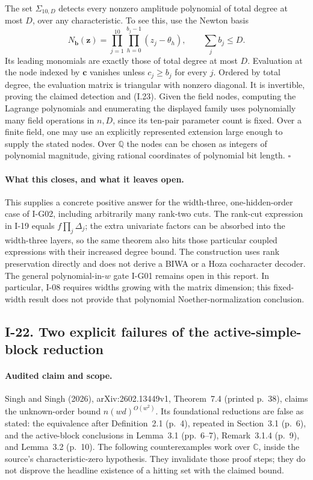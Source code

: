The set $\Sigma_{10,D}$ detects every nonzero amplitude polynomial
of total degree at most $D$, over any characteristic.  To see this,
use the Newton basis
\[
 N_{\mathbf b}(\mathbf z)
  =\prod_{j=1}^{10}\prod_{h=0}^{b_j-1}(z_j-\theta_h),
 \qquad \sum_jb_j\le D.
\]
Its leading monomials are exactly those of total degree at most
$D$.  Evaluation at the node indexed by $\mathbf c$ vanishes
unless $c_j\ge b_j$ for every $j$.  Ordered by total degree,
the evaluation matrix is triangular with nonzero diagonal.
It is invertible, proving the claimed detection and (I.23).
Given the field nodes, computing the Lagrange polynomials and
enumerating the displayed family uses polynomially many field
operations in $n,D$, since its ten-pair parameter count is fixed.
Over a finite field, one may use an explicitly represented
extension large enough to supply the stated nodes.  Over
$\mathbb Q$ the nodes can be chosen as integers of polynomial
magnitude, giving rational coordinates of polynomial bit length.
\hfill$\square$

\paragraph{What this closes, and what it leaves open.}
This supplies a concrete positive answer for the width-three,
one-hidden-order case of I-G02, including arbitrarily many
rank-two cuts.  The rank-cut expression in I-19 equals
$f\prod_j\Delta_j$; the extra univariate factors can be absorbed
into the width-three layers, so the same theorem also hits those
particular coupled expressions with their increased degree bound.
The construction uses rank preservation directly and does not
derive a BIWA or a Hoza cocharacter decoder.
The general polynomial-in-$w$ gate I-G01 remains open in this
report.  In particular, I-08 requires widths growing with the
matrix dimension; this fixed-width result does not provide that
polynomial Noether-normalization conclusion.


\subsection{I-22. Two explicit failures of the active-simple-block reduction}
\label{I-22}

\paragraph{Audited claim and scope.}
Singh and Singh (2026), arXiv:2602.13449v1, Theorem~7.4
(printed p.~38), claims the unknown-order bound
$n(wd)^{O(w^2)}$.  Its foundational reductions are false as stated:
the equivalence after Definition~2.1 (p.~4), repeated in
Section~3.1 (p.~6), and the active-block conclusions in
Lemma~3.1 (pp.~6--7), Remark~3.1.4 (p.~9), and Lemma~3.2
(p.~10).  The following counterexamples work over $\mathbb C$,
inside the source's characteristic-zero hypothesis.  They
invalidate those proof steps; they do not disprove the headline
existence of a hitting set with the claimed bound.

